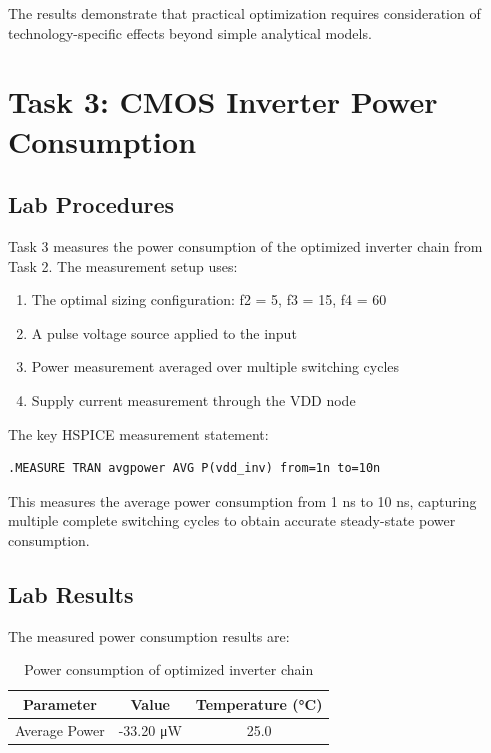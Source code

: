 \documentclass[UTF8,12pt,a4paper]{ctexart}
\begin{document}
The results demonstrate that practical optimization requires consideration of technology-specific effects beyond simple analytical models.

\section{Task 3: CMOS Inverter Power Consumption}

\subsection{Lab Procedures}

Task 3 measures the power consumption of the optimized inverter chain from Task 2. The measurement setup uses:

\begin{enumerate}
    \item The optimal sizing configuration: f2 = 5, f3 = 15, f4 = 60
    \item A pulse voltage source applied to the input
    \item Power measurement averaged over multiple switching cycles
    \item Supply current measurement through the VDD node
\end{enumerate}

The key HSPICE measurement statement:

\begin{verbatim}
.MEASURE TRAN avgpower AVG P(vdd_inv) from=1n to=10n
\end{verbatim}

This measures the average power consumption from 1 ns to 10 ns, capturing multiple complete switching cycles to obtain accurate steady-state power consumption.

\subsection{Lab Results}

The measured power consumption results are:

\begin{table}[h]
\centering
\begin{tabular}{|c|c|c|}
\hline
\textbf{Parameter} & \textbf{Value} & \textbf{Temperature (°C)} \\
\hline
Average Power & -33.20 μW & 25.0 \\
\hline
\end{tabular}
\caption{Power consumption of optimized inverter chain}
\end{table}
\end{document}
